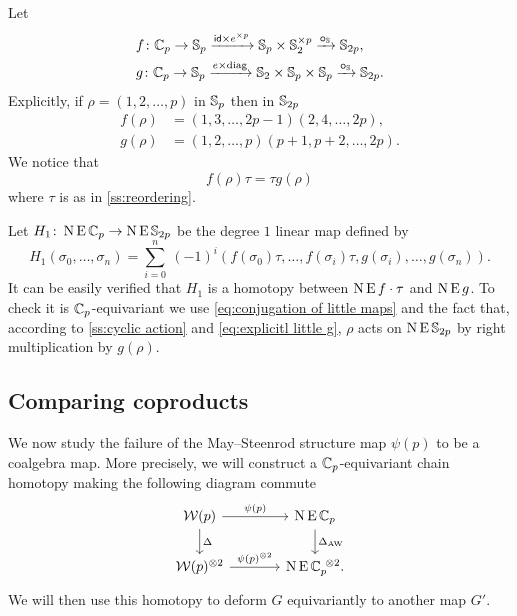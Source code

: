 \sssec

Let
\[
\begin{split}
	&f \colon \mathbb{C}_p \to \mathbb{S}_p \xrightarrow{\mathsf{id} \times e^{\times p}} \mathbb{S}_p \times \mathbb{S}_2^{\times p} \xrightarrow{\bm{\circ}_{\mathbb{S}}} \mathbb{S}_{2p}, \\
	&g \colon \mathbb{C}_p \to \mathbb{S}_p \xrightarrow{e \times \mathrm{diag}} \mathbb{S}_2 \times \mathbb{S}_p \times \mathbb{S}_p \xrightarrow{\bm{\circ}_{\mathbb{S}}} \mathbb{S}_{2p}.
\end{split}
\]
Explicitly, if $\rho = (1,2,\dots,p)$ in $\mathbb{S}_p$ then in $\mathbb{S}_{2p}$
\begin{align}
	\label{eq:explicitl little f}
	f(\rho) &= (1,3,\dots,2p-1)(2,4,\dots,2p), \\
	\label{eq:explicitl little g}
	g(\rho) &= (1,2,\dots,p)(p+1,p+2,\dots,2p).
\end{align}
We notice that
\begin{equation}\label{eq:conjugation of little maps}
	f(\rho) \tau = \tau g(\rho)
\end{equation}
where $\tau$ is as in \cref{ss:reordering}.

\sssec

Let $H_1 \colon \operatorname{N}\operatorname{E}\mathbb{C}_p \to \operatorname{N}\operatorname{E}\mathbb{S}_{2p}$ be the degree $1$ linear map defined by
\[
H_1(\sigma_0,\dots,\sigma_n) =
\sum_{i=0}^n \ (-1)^i (f(\sigma_0) \tau, \dots, f(\sigma_i) \tau, g(\sigma_i), \dots, g(\sigma_n)).
\]
It can be easily verified that $H_1$ is a homotopy between $\operatorname{N} \operatorname{E} f \cdot \tau$ and $\operatorname{N} \operatorname{E} g$.
To check it is $\mathbb{C}_p$-equivariant we use \cref{eq:conjugation of little maps} and the fact that, according to \cref{ss:cyclic action} and \eqref{eq:explicitl little g}, $\rho$ acts on $\operatorname{N}\operatorname{E}\mathbb{S}_{2p}$ by right multiplication by $g(\rho)$.

\subsection{Comparing coproducts}

We now study the failure of the May--Steenrod structure map $\psi(p)$ to be a coalgebra map.
More precisely, we will construct a $\mathbb{C}_p$-equivariant chain homotopy making the following diagram commute
\[
\begin{tikzcd}[column sep=large]
	\cW(p) \arrow[r,"\psi(p)"] \arrow[d,"\Delta"] & \chains\EE\cyc_p \arrow[d,"\Delta_{\AW}"]\\
	\cW(p)^{\ot 2} \arrow[r,"\psi(p)^{\ot 2}"] & \chains\EE\cyc_p^{\ \ot 2}.
\end{tikzcd}
\]
We will then use this homotopy to deform $G$ equivariantly to another map $G'$.

